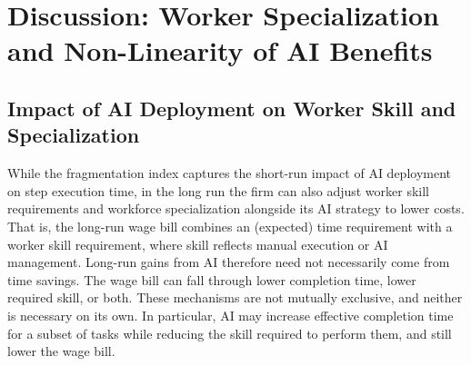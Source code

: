 




\section{Discussion: Worker Specialization and Non-Linearity of AI Benefits}

\subsection{Impact of AI Deployment on Worker Skill and Specialization}
\label{sec:discussion.skills}

While the fragmentation index captures the short-run impact of AI deployment on step execution time, in the long run the firm can also adjust worker skill requirements and workforce specialization alongside its AI strategy to lower costs. 
That is, the long-run wage bill combines an (expected) time requirement with a worker skill requirement, where skill reflects manual execution or AI management. 
Long-run gains from AI therefore need not necessarily come from time savings. 
The wage bill can fall through lower completion time, lower required skill, or both. 
These mechanisms are not mutually exclusive, and neither is necessary on its own.
In particular, AI may increase effective completion time for a subset of tasks while reducing the skill required to perform them, and still lower the wage bill. 

